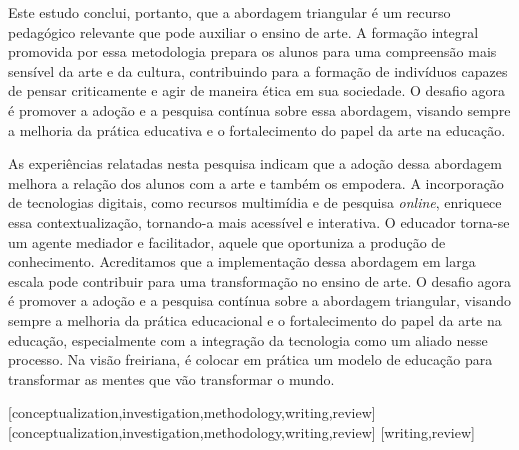 \documentclass[portuguese]{textolivre}
\begin{document}
Este estudo conclui, portanto, que a abordagem triangular é um recurso pedagógico relevante que pode auxiliar o ensino de arte. A formação integral promovida por essa metodologia prepara os alunos para uma compreensão mais sensível da arte e da cultura, contribuindo para a formação de indivíduos capazes de pensar criticamente e agir de maneira ética em sua sociedade. O desafio agora é promover a adoção e a pesquisa contínua sobre essa abordagem, visando sempre a melhoria da prática educativa e o fortalecimento do papel da arte na educação.

As experiências relatadas nesta pesquisa indicam que a adoção dessa abordagem melhora a relação dos alunos com a arte e também os empodera. A incorporação de tecnologias digitais, como recursos multimídia e de pesquisa \textit{online}, enriquece essa contextualização, tornando-a mais acessível e interativa. O educador torna-se um agente mediador e facilitador, aquele que oportuniza a produção de conhecimento. Acreditamos que a implementação dessa abordagem em larga escala pode contribuir para uma transformação no ensino de arte. O desafio agora é promover a adoção e a pesquisa contínua sobre a abordagem triangular, visando sempre a melhoria da prática educacional e o fortalecimento do papel da arte na educação, especialmente com a integração da tecnologia como um aliado nesse processo. Na visão freiriana, é colocar em prática um modelo de educação para transformar as mentes que vão transformar o mundo.

\printbibliography\label{sec-bib}


\begin{contributors}
[conceptualization,investigation,methodology,writing,review]
[conceptualization,investigation,methodology,writing,review]
[writing,review]
\end{contributors}

\begin{dataavailability}
\end{dataavailability}
\end{document}
